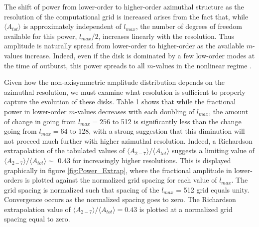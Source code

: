 \documentclass[manuscript]{aastex}
\newcommand{\ACBc}[1]{{\color{red} #1}}
\newcommand{\TSCc}[1]{{\color{magenta} #1}}
\begin{document}
The shift of power from lower-order to higher-order azimuthal structure as the resolution of the computational grid is increased arises from the fact that, while $\langle A_{tot} \rangle$ is approximately independent of $l_{max}$,  the number of degrees of freedom available for this power, $l_{max}/2$, increases linearly with the resolution. Thus amplitude is naturally spread from lower-order to higher-order as the available $m$-values increase. 
Indeed, even if the disk is dominated by a few low-order modes at the time of outburst, this power spreads to all
$m$-values in the nonlinear regime \citep[for example][]{laughlin1997, laughlin1998,laughlin1996}. 

Given how the non-axisymmetric amplitude distribution depends on the azimuthal resolution, we must examine what resolution is sufficient to properly capture the evolution of these disks. Table 1 shows that while the fractional power in 
lower-order $m$-values
decreases with each doubling of $l_{max}$, the amount of change in going from $l_{max} = 256$ to 512 
is significantly less than the change going from $l_{max} = 64$ to 128, with a strong suggestion that this diminution will not proceed much further with higher azimuthal resolution. Indeed, a  Richardson extrapolation \citep{press1992} of the tabulated values of  $\langle A_{2-7} \rangle / \langle A_{tot} \rangle$ suggests a limiting value of  $\langle A_{2-7} \rangle / \langle A_{tot} \rangle \sim$ 0.43 for increasingly higher resolutions. This is displayed graphically in figure \ref{fig:Power_Extrap}, where the fractional amplitude in lower-orders is plotted against the  normalized grid 
spacing for each value of $l_{max}$. The grid spacing  is normalized such that spacing of the $l_{max}$ = 512 grid
equals unity. 
Convergence occurs as the normalized spacing goes to zero. The Richardson extrapolation value  
of $\langle A_{2-7}\rangle  / \langle A_{tot}\rangle  = 0.43$ is plotted at a normalized grid spacing  equal to zero. 
 
\end{document}
